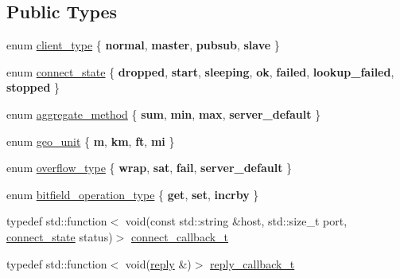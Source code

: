 \subsection*{Public Types}
\begin{DoxyCompactItemize}
\item 
enum \mbox{\hyperlink{classcpp__redis_1_1client_a388877b01b4e045cddb138e70a68e000}{client\+\_\+type}} \{ {\bfseries normal}, 
{\bfseries master}, 
{\bfseries pubsub}, 
{\bfseries slave}
 \}
\item 
enum \mbox{\hyperlink{classcpp__redis_1_1client_a2512bd48dd45391249a69bd720c1e4da}{connect\+\_\+state}} \{ \newline
{\bfseries dropped}, 
{\bfseries start}, 
{\bfseries sleeping}, 
{\bfseries ok}, 
\newline
{\bfseries failed}, 
{\bfseries lookup\+\_\+failed}, 
{\bfseries stopped}
 \}
\item 
enum \mbox{\hyperlink{classcpp__redis_1_1client_aa197ca5b36da793c701d3ba388ec4946}{aggregate\+\_\+method}} \{ {\bfseries sum}, 
{\bfseries min}, 
{\bfseries max}, 
{\bfseries server\+\_\+default}
 \}
\item 
enum \mbox{\hyperlink{classcpp__redis_1_1client_aa5998536fd32ff4387c89be514997620}{geo\+\_\+unit}} \{ {\bfseries m}, 
{\bfseries km}, 
{\bfseries ft}, 
{\bfseries mi}
 \}
\item 
enum \mbox{\hyperlink{classcpp__redis_1_1client_a4119182ad3a01c1bb626a174375e114a}{overflow\+\_\+type}} \{ {\bfseries wrap}, 
{\bfseries sat}, 
{\bfseries fail}, 
{\bfseries server\+\_\+default}
 \}
\item 
enum \mbox{\hyperlink{classcpp__redis_1_1client_a2e2023534299541da0a659802e2f087d}{bitfield\+\_\+operation\+\_\+type}} \{ {\bfseries get}, 
{\bfseries set}, 
{\bfseries incrby}
 \}
\item 
typedef std\+::function$<$ void(const std\+::string \&host, std\+::size\+\_\+t port, \mbox{\hyperlink{classcpp__redis_1_1client_a2512bd48dd45391249a69bd720c1e4da}{connect\+\_\+state}} status)$>$ \mbox{\hyperlink{classcpp__redis_1_1client_a8e8f308847caf0b9ce06b817253c65c7}{connect\+\_\+callback\+\_\+t}}
\item 
typedef std\+::function$<$ void(\mbox{\hyperlink{classcpp__redis_1_1reply}{reply}} \&)$>$ \mbox{\hyperlink{classcpp__redis_1_1client_af7a65eb21aa25230bfbb0b0203c4fc04}{reply\+\_\+callback\+\_\+t}}
\end{DoxyCompactItemize}
